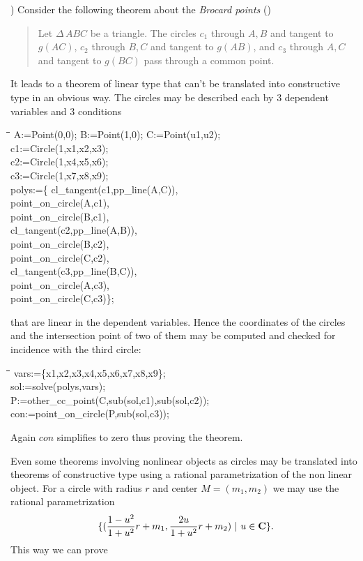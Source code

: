 \documentclass{article}
\newenvironment{code}{\tt \begin{tabbing}
\hspace*{1cm}\=\hspace*{1cm}\=\hspace*{1cm}\=
\hspace*{1cm}\=\hspace*{1cm}\=\kill
}{\end{tabbing}}
\begin{document}
) Consider the following theorem about the {\em Brocard
points} (\cite[p.~336]{Chou:88})
\begin{quote}
Let $\Delta\,ABC$ be a triangle. The circles $c_1$ through $A,B$ and
tangent to $g(AC)$, $c_2$ through $B,C$ and tangent to $g(AB)$, and
$c_3$ through $A,C$ and tangent to $g(BC)$ pass through a common
point.
\end{quote}
It leads to a theorem of linear type that can't be translated into
constructive type in an obvious way. The circles may be described each
by 3 dependent variables and 3 conditions
\begin{code}\>\+
A:=Point(0,0); B:=Point(1,0); C:=Point(u1,u2);\\[6pt]

c1:=Circle(1,x1,x2,x3);\\
c2:=Circle(1,x4,x5,x6);\\
c3:=Circle(1,x7,x8,x9);\-\\[6pt]

polys:=\{\>\>
	cl\_tangent(c1,pp\_line(A,C)), \+\+\\
	point\_on\_circle(A,c1), \\
	point\_on\_circle(B,c1), \\
	cl\_tangent(c2,pp\_line(A,B)), \\
	point\_on\_circle(B,c2), \\
	point\_on\_circle(C,c2), \\
	cl\_tangent(c3,pp\_line(B,C)), \\
	point\_on\_circle(A,c3), \\
	point\_on\_circle(C,c3)\};
\end{code}
that are linear in the dependent variables. Hence the coordinates of
the circles and the intersection point of two of them may be computed
and checked for incidence with the third circle:
\begin{code}\>\+
vars:=\{x1,x2,x3,x4,x5,x6,x7,x8,x9\};\\
sol:=solve(polys,vars);\\[6pt]

P:=other\_cc\_point(C,sub(sol,c1),sub(sol,c2));\\
con:=point\_on\_circle(P,sub(sol,c3));
\end{code}
Again $con$ simplifies to zero thus proving the theorem.
\medskip

Even some theorems involving nonlinear objects as circles may be
translated into theorems of constructive type using a rational
parametrization of the non linear object. For a circle with radius $r$
and center $M=(m_1,m_2)$ we may use the rational parametrization
\[\{(\frac{1-u^2}{1+u^2}r+m_1,\frac{2u}{1+u^2}r+m_2)\ |\ u\in {\bf
C}\}.\] 
This way we can prove
\medskip
\end{document}

